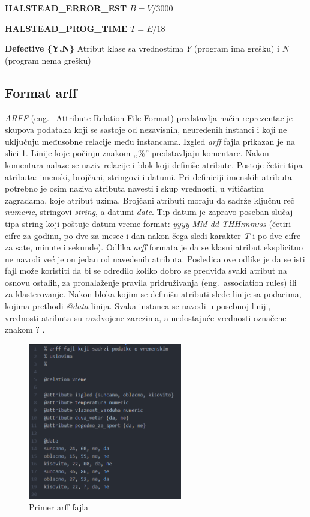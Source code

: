 \documentclass[12pt,oneside]{memoir}
\begin{document}
\textbf{HALSTEAD\_ERROR\_EST} $B = V/3000$

\textbf{HALSTEAD\_PROG\_TIME} $T = E/18$

\textbf{Defective \{Y,N\} } Atribut klase sa vrednostima $Y$ (program ima grešku) i $N$ (program nema grešku)

\subsection{Format arff}
\textit{ARFF} (eng.~ Attribute-Relation File Format) predstavlja način reprezentacije skupova podataka koji se sastoje od nezavisnih, neuređenih instanci i koji ne uključuju međusobne relacije među instancama. Izgled \textit{arff} fajla prikazan je na slici \ref{fig:arff}. Linije koje počinju znakom ,,\%'' predstavljaju komentare. Nakon komentara nalaze se naziv relacije i blok koji definiše atribute. Postoje četiri tipa atributa: imenski, brojčani, stringovi i datumi. Pri definiciji imenskih atributa potrebno je osim naziva atributa navesti i skup vrednosti, u vitičastim zagradama, koje atribut uzima. Brojčani atributi moraju da sadrže ključnu reč \textit{numeric}, stringovi \textit{string}, a datumi \textit{date}. Tip datum je zapravo poseban slučaj tipa string koji poštuje datum-vreme format: \textit{yyyy-MM-dd-THH:mm:ss} (četiri cifre za godinu, po dve za mesec i dan nakon čega sledi karakter \textit{T} i po dve cifre za sate, minute i sekunde). Odlika \textit{arff} formata je da se klasni atribut eksplicitno ne navodi već je on jedan od navedenih atributa. Posledica ove odlike je da se isti fajl može koristiti da bi se odredilo koliko dobro se predviđa svaki atribut na osnovu ostalih, za pronalaženje pravila pridruživanja (eng.~association rules) ili za klasterovanje. Nakon bloka kojim se definišu atributi slede linije sa podacima, kojima prethodi \textit{@data} linija. Svaka instanca se navodi u posebnoj liniji, vrednosti atributa su razdvojene zarezima, a nedostajuće vrednosti označene znakom $?$ \cite{weka}. 

\begin{figure}[!ht]
  \centering
  \includegraphics[width=0.60\textwidth]{arff.png}
  \caption{Primer arff fajla}
  \label{fig:arff}
\end{figure}
\end{document}
